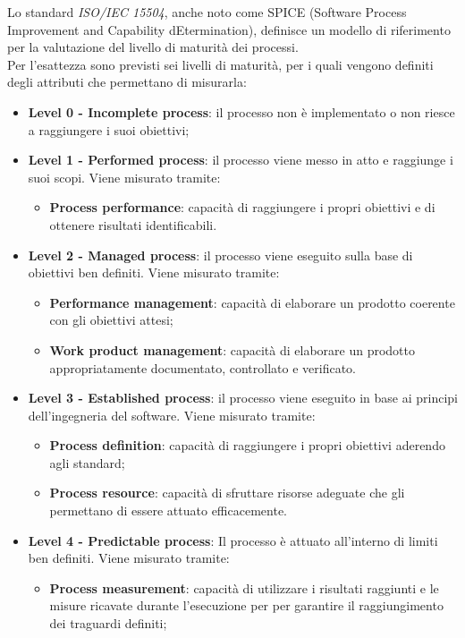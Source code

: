 Lo standard \textit{ISO/IEC 15504}, anche noto come SPICE (Software Process Improvement and Capability dEtermination), definisce un modello di riferimento per la valutazione del livello di maturità dei processi. \\ 
Per l'esattezza sono previsti sei livelli di maturità, per i quali vengono definiti degli attributi che permettano di misurarla:
\begin{itemize}
\item\textbf{Level 0 - Incomplete process}: il processo non è implementato o non riesce a raggiungere i suoi obiettivi;
\item\textbf{Level 1 - Performed process}: il processo viene messo in atto e raggiunge i suoi scopi. Viene misurato tramite:
\begin{itemize}
\item\textbf{Process performance}: capacità di raggiungere i propri obiettivi e di ottenere risultati identificabili.
\end{itemize}
\item\textbf{Level 2 - Managed process}: il processo viene eseguito sulla base di obiettivi ben definiti. Viene misurato tramite:
\begin{itemize}
\item\textbf{Performance management}: capacità di elaborare un prodotto coerente con gli obiettivi attesi;
\item\textbf{Work product management}: capacità di elaborare un prodotto appropriatamente documentato, controllato e verificato.
\end{itemize}
\item\textbf{Level 3 - Established process}: il processo viene eseguito in base ai principi dell’ingegneria del software. Viene misurato tramite:
\begin{itemize}
\item\textbf{Process definition}: capacità di raggiungere i propri obiettivi aderendo agli standard;
\item\textbf{Process resource}: capacità di sfruttare risorse adeguate che gli permettano di essere attuato efficacemente.
\end{itemize}
\item\textbf{Level 4 - Predictable process}: Il processo è attuato all'interno di limiti ben definiti. Viene misurato tramite:
\begin{itemize}
\item\textbf{Process measurement}: capacità di utilizzare i risultati raggiunti e le misure ricavate durante l'esecuzione per per garantire il raggiungimento dei traguardi definiti;

\end{itemize}
\end{itemize}
